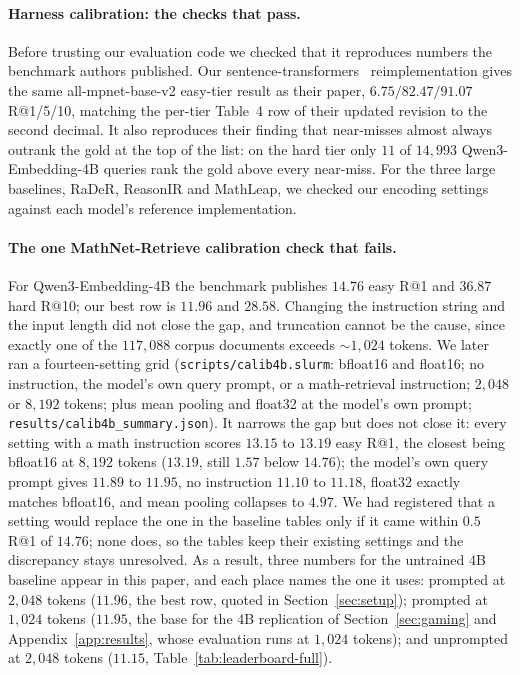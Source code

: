\paragraph{Harness calibration: the checks that pass.}Before trusting our evaluation code we checked that it reproduces numbers the benchmark authors published. Our sentence-transformers~\citep{reimers2019sentencebert} reimplementation gives the same all-mpnet-base-v2 easy-tier result as their paper, $6.75/82.47/91.07$ R@1/5/10, matching the per-tier Table~4 row of their updated revision to the second decimal. It also reproduces their finding that near-misses almost always outrank the gold at the top of the list: on the hard tier only $11$ of $14{,}993$ Qwen3-Embedding-4B queries rank the gold above every near-miss. For the three large baselines, RaDeR, ReasonIR and MathLeap, we checked our encoding settings against each model's reference implementation.

\paragraph{The one MathNet-Retrieve calibration check that fails.}
For Qwen3-Embedding-4B the benchmark publishes $14.76$ easy R@1 and $36.87$ hard R@10; our best row is $11.96$ and $28.58$. Changing the instruction string and the input length did not close the gap, and truncation cannot be the cause, since exactly one of the $117{,}088$ corpus documents exceeds ${\sim}1{,}024$ tokens. We later ran a fourteen-setting grid (\texttt{scripts/calib4b.slurm}: bfloat16 and float16; no instruction, the model's own query prompt, or a math-retrieval instruction; $2{,}048$ or $8{,}192$ tokens; plus mean pooling and float32 at the model's own prompt; \texttt{results/calib4b\_summary.json}). It narrows the gap but does not close it: every setting with a math instruction scores $13.15$ to $13.19$ easy R@1, the closest being bfloat16 at $8{,}192$ tokens ($13.19$, still $1.57$ below $14.76$); the model's own query prompt gives $11.89$ to $11.95$, no instruction $11.10$ to $11.18$, float32 exactly matches bfloat16, and mean pooling collapses to $4.97$. We had registered that a setting would replace the one in the baseline tables only if it came within $0.5$ R@1 of $14.76$; none does, so the tables keep their existing settings and the discrepancy stays unresolved. As a result, three numbers for the untrained $4$B baseline appear in this paper, and each place names the one it uses: prompted at $2{,}048$ tokens ($11.96$, the best row, quoted in Section~\ref{sec:setup}); prompted at $1{,}024$ tokens ($11.95$, the base for the $4$B replication of Section~\ref{sec:gaming} and Appendix~\ref{app:results}, whose evaluation runs at $1{,}024$ tokens); and unprompted at $2{,}048$ tokens ($11.15$, Table~\ref{tab:leaderboard-full}).


